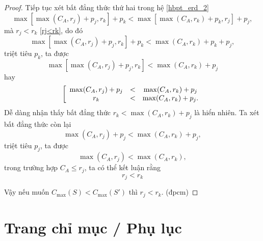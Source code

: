 \documentclass[12pt,a4paper]{report}
\begin{document}
\begin{proof}
	Tiếp tục xét bất đẳng thức thứ hai trong hệ \eqref{hbpt_erd_2}
	\begin{equation}
		\max \left[ \max (C_A, r_j) + p_j, r_k \right] + p_k < \max \left[ \max (C_A, r_k) + p_k, r_j \right] + p_j,
	\end{equation}
	mà $r_j<r_k$ \eqref{rj<rk}, do đó
	\begin{equation}
		\max \left[ \max (C_A, r_j) + p_j, r_k \right] + p_k < \max (C_A, r_k) + p_k + p_j,
	\end{equation}
	triệt tiêu $p_k$, ta được
	\begin{equation}
		\max \left[ \max (C_A, r_j) + p_j, r_k \right] < \max (C_A, r_k) + p_j
	\end{equation}
	hay
	\begin{equation}
		\left[
			\begin{array}{c c c}
				\max (C_A, r_j) + p_j &<& \max (C_A, r_k) + p_j \\
				r_k &<& \max (C_A, r_k) + p_j.
			\end{array}
		\right.
	\end{equation}
	Dễ dàng nhận thấy bất đẳng thức $r_k < \max (C_A, r_k) + p_j$ là hiển nhiên. Ta xét bất đẳng thức còn lại
	\begin{equation}
			\max (C_A, r_j) + p_j < \max (C_A, r_k) + p_j,
	\end{equation}
	triệt tiêu $p_j$, ta được
	\begin{equation}
			\max (C_A, r_j) < \max (C_A, r_k),
	\end{equation}
	trong trường hợp $C_A \leq r_j$, ta có thể kết luận rằng
	\begin{equation}
			r_j < r_k
	\end{equation}

	Vậy nếu muốn $C_{\max}(S) < C_{\max}(S')$ thì $r_j < r_k$. (đpcm)
\end{proof}

\phantom{text}

\phantom{text}

\section*{Trang chỉ mục / Phụ lục}
\end{document}
